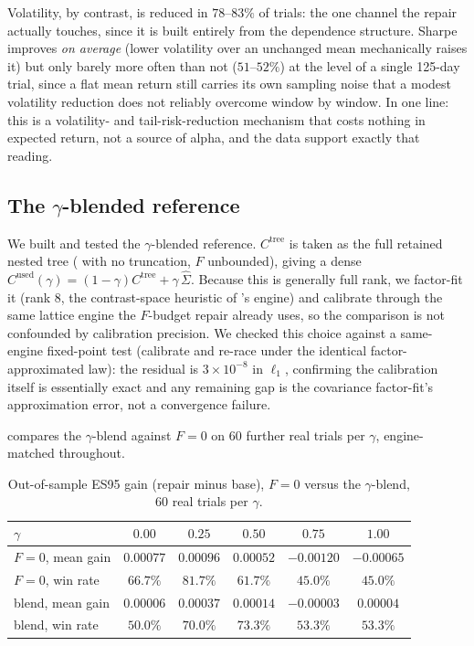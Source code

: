 \documentclass[11pt]{article}
\begin{document}
Volatility, by contrast, is reduced in $78$--$83\%$ of trials: the one
channel the repair actually touches, since it is built entirely from the
dependence structure. Sharpe improves \emph{on average} (lower volatility
over an unchanged mean mechanically raises it) but only barely more often
than not ($51$--$52\%$) at the level of a single 125-day trial, since a flat
mean return still carries its own sampling noise that a modest volatility
reduction does not reliably overcome window by window. In one line: this is
a volatility- and tail-risk-reduction mechanism that costs nothing in
expected return, not a source of alpha, and the data support exactly that
reading.

\subsection{The $\gamma$-blended reference}
\label{sec:blend}

We built and tested the $\gamma$-blended reference. $C^{\mathrm{tree}}$ is taken as the full retained
nested tree ( with no truncation, $F$ unbounded), giving a
dense $C^{\mathrm{used}}(\gamma)=(1-\gamma)C^{\mathrm{tree}}+\gamma\,\hat\Sigma$.
Because this is generally full rank, we factor-fit it (rank $8$, the
contrast-space heuristic of 's engine) and calibrate through
the same lattice engine the $F$-budget repair already uses, so the
comparison is not confounded by calibration precision. We checked this
choice against a same-engine fixed-point test (calibrate and re-race under
the identical factor-approximated law): the residual is $3\times10^{-8}$ in
$\ell_1$, confirming the calibration itself is essentially exact and any
remaining gap is the covariance factor-fit's approximation error, not a
convergence failure.

 compares the $\gamma$-blend against $F=0$ on $60$ further
real trials per $\gamma$, engine-matched throughout.

\begin{table}[h]
\centering
\caption{Out-of-sample ES95 gain (repair minus base), $F=0$ versus the
$\gamma$-blend, $60$ real trials per $\gamma$.}
\label{tab:blend}
\footnotesize
\begin{tabular}{lccccc}
\toprule
$\gamma$ & $0.00$ & $0.25$ & $0.50$ & $0.75$ & $1.00$ \\
\midrule
$F=0$, mean gain      & $0.00077$ & $0.00096$ & $0.00052$ & $-0.00120$ & $-0.00065$ \\
$F=0$, win rate       & $66.7\%$  & $81.7\%$  & $61.7\%$  & $45.0\%$   & $45.0\%$   \\
blend, mean gain      & $0.00006$ & $0.00037$ & $0.00014$ & $-0.00003$ & $0.00004$  \\
blend, win rate       & $50.0\%$  & $70.0\%$  & $73.3\%$  & $53.3\%$   & $53.3\%$   \\
\bottomrule
\end{tabular}
\end{table}
\end{document}
